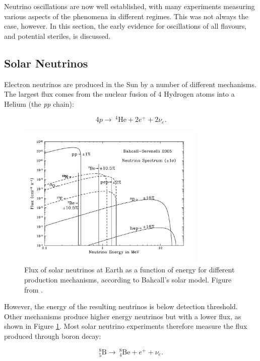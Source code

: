 Neutrino oscillations are now well established, with many experiments measuring various aspects of the phenomena in different regimes. This was not always the case, however. In this section, the early evidence for oscillations of all flavours, and potential steriles, is discussed.

\subsection{Solar Neutrinos}\label{sec:solarneutrinos}

Electron neutrinos are produced in the Sun by a number of different mechanisms. The largest flux comes from the nuclear fusion of 4 Hydrogen atoms into a Helium (the \textit{pp} chain):

\begin{equation}
4 p \rightarrow \medspace ^{4}\text{He} + 2e^{+} + 2\nu_e.
\end{equation}

\begin{figure}[!htbp]
\centering
\includegraphics*[width=0.8\textwidth,clip]{figs/bwbahcallserenellibs05OP.pdf}
\caption{Flux of solar neutrinos at Earth as a function of energy for different production mechanisms, according to Bahcall's solar model. Figure from \cite{behcallflux}.} \label{solarflux}
\end{figure}

However, the energy of the resulting neutrinos is below detection threshold. Other mechanisms produce higher energy neutrinos but with a lower flux, as shown in Figure \ref{solarflux}. Most solar neutrino experiments therefore measure the flux produced through boron decay:

\begin{equation}
^{8}_{5}\text{B} \rightarrow  \medspace ^{8}_{4} \text{Be} + e^{+} + \nu_e.
\end{equation}

